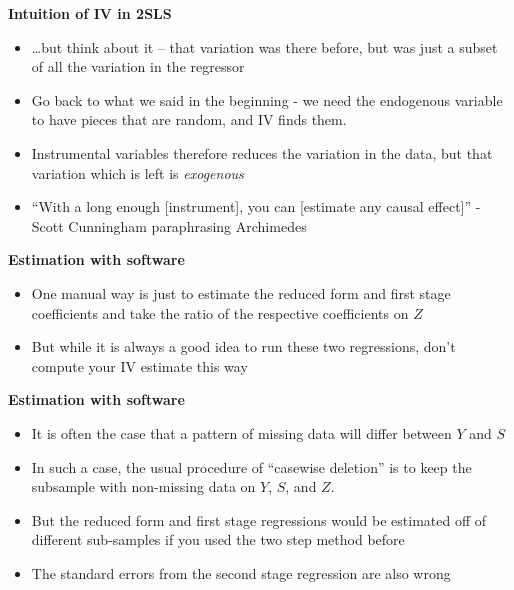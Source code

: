 \documentclass[notes=show]{beamer}
\begin{document}
\begin{frame}[plain]
\begin{center}
\textbf{Intuition of IV in 2SLS}
\end{center}

\begin{itemize}
	\item \dots but think about it -- that variation was there before, but was just a subset of all the variation in the regressor
	\item Go back to what we said in the beginning - we need the endogenous variable to have pieces that are random, and IV finds them.
	\item Instrumental variables therefore reduces the variation in the data, but that variation which is left is 
\emph{exogenous}
	\item ``With a long enough [instrument], you can [estimate any causal effect]'' - Scott Cunningham paraphrasing Archimedes
\end{itemize}

\end{frame}
	




\begin{frame}[plain]

	\begin{center}
	\textbf{Estimation with software}
	\end{center}

	\begin{itemize}
	\item One manual way is just to estimate the reduced form and first stage coefficients and take the ratio of the respective coefficients on $Z$
	\item But while it is always a good idea to run these two regressions, don't compute your IV estimate this way 
	\end{itemize}
\end{frame}

\begin{frame}[plain]
\begin{center}
\textbf{Estimation with software}
\end{center}

\begin{itemize}
		\item It is often the case that a pattern of missing data will differ between $Y$ and $S$
		\item In such a case, the usual procedure of ``casewise deletion'' is to keep the subsample with non-missing data on $Y$, $S$, and $Z$.
		\item But the reduced form and first stage regressions would be estimated off of different sub-samples if you used the two step method before
		\item The standard errors from the second stage regression are also wrong
\end{itemize}

\end{frame}
\end{document}
